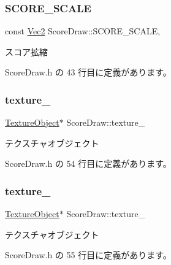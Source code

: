 \subsubsection{\texorpdfstring{S\+C\+O\+R\+E\+\_\+\+S\+C\+A\+LE}{SCORE\_SCALE}}
{\footnotesize\ttfamily const \mbox{\hyperlink{_vector3_d_8h_a5ef6e95dfc5f9d3820b71772d99bbc25}{Vec2}} Score\+Draw\+::\+S\+C\+O\+R\+E\+\_\+\+S\+C\+A\+LE\hspace{0.3cm}{\ttfamily [static]}, {\ttfamily [private]}}



スコア拡縮 



 Score\+Draw.\+h の 43 行目に定義があります。

\mbox{\label{class_score_draw_a872c53e6feeb4d68378f7dfc64b561d0}} 
\subsubsection{\texorpdfstring{texture\+\_\+}{texture\_}}
{\footnotesize\ttfamily \mbox{\hyperlink{class_texture_object}{Texture\+Object}}$\ast$ Score\+Draw\+::texture\+\_\+\hspace{0.3cm}{\ttfamily [private]}}



テクスチャオブジェクト 



 Score\+Draw.\+h の 54 行目に定義があります。

\mbox{\label{class_score_draw_ab9917e429ef58b400f75f0a4b48968da}} 
\subsubsection{\texorpdfstring{texture\+\_}{texture\_2}}
{\footnotesize\ttfamily \mbox{\hyperlink{class_texture_object}{Texture\+Object}}$\ast$ Score\+Draw\+::texture\+\_\hspace{0.3cm}{\ttfamily [private]}}



テクスチャオブジェクト 



 Score\+Draw.\+h の 55 行目に定義があります。

